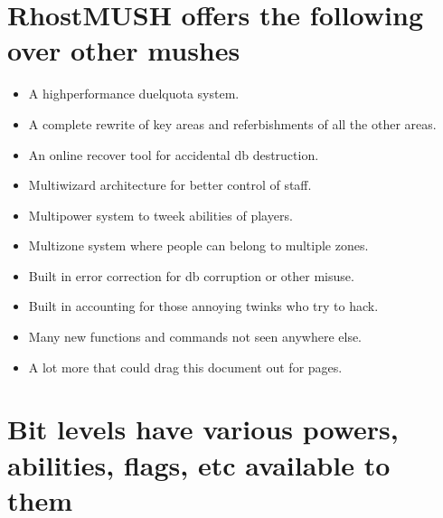 \documentclass[letterpaper,10pt,english]{sphinxmanual}
\begin{document}
\section{RhostMUSH offers the following over other mushes}
\label{\detokenize{29-setup:rhostmush-offers-the-following-over-other-mushes}}\begin{itemize}
\item {} 
\sphinxAtStartPar
A high\sphinxhyphen{}performance duel\sphinxhyphen{}quota system.

\item {} 
\sphinxAtStartPar
A complete rewrite of key areas and referbishments
of all the other areas.

\item {} 
\sphinxAtStartPar
An on\sphinxhyphen{}line recover tool for accidental db destruction.

\item {} 
\sphinxAtStartPar
Multi\sphinxhyphen{}wizard architecture for better control of staff.

\item {} 
\sphinxAtStartPar
Multi\sphinxhyphen{}power system to tweek abilities of players.

\item {} 
\sphinxAtStartPar
Multi\sphinxhyphen{}zone system where people can belong to multiple zones.

\item {} 
\sphinxAtStartPar
Built in error correction for db corruption or other misuse.

\item {} 
\sphinxAtStartPar
Built in accounting for those annoying twinks who try to hack.

\item {} 
\sphinxAtStartPar
Many new functions and commands not seen anywhere else.

\item {} 
\sphinxAtStartPar
A lot more that could drag this document out for pages.

\end{itemize}


\section{Bit levels have various powers, abilities, flags, etc available to them}
\label{\detokenize{29-setup:bit-levels-have-various-powers-abilities-flags-etc-available-to-them}}
\end{document}
